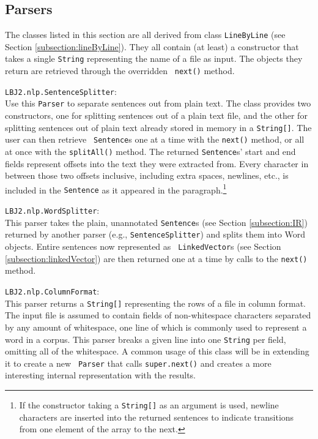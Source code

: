 \subsection{Parsers} \label{subsection:parsers}

The classes listed in this section are all derived from class {\tt LineByLine}
(see Section \ref{subsection:lineByLine}).  They all contain (at least) a
constructor that takes a single {\tt String} representing the name of a file
as input.  The objects they return are retrieved through the overridden {\tt
next()} method.

\begin{list}{}{}
\item[{\tt LBJ2.nlp.SentenceSplitter}:] ~\\
Use this {\tt Parser} to separate sentences out from plain text.  The class
provides two constructors, one for splitting sentences out of a plain text
file, and the other for splitting sentences out of plain text already stored
in memory in a {\tt String[]}.  The user can then retrieve {\tt
Sentence}s one at a time with the {\tt next()} method, or all at once with
the {\tt splitAll()} method.  The returned {\tt Sentence}s' start and end
fields represent offsets into the text they were extracted from.  Every
character in between those two offsets inclusive, including extra spaces,
newlines, etc., is included in the {\tt Sentence} as it appeared in the
paragraph.\footnote{If the constructor taking a {\tt String[]} as an
argument is used, newline characters are inserted into the returned sentences
to indicate transitions from one element of the array to the next.}

\item[{\tt LBJ2.nlp.WordSplitter}:] ~\\
This parser takes the plain, unannotated {\tt Sentence}s (see Section
\ref{subsection:IR}) returned by another parser (e.g., {\tt SentenceSplitter})
and splits them into Word objects.  Entire sentences now represented as {\tt
LinkedVector}s (see Section \ref{subsection:linkedVector}) are then returned
one at a time by calls to the {\tt next()} method.

\item[{\tt LBJ2.nlp.ColumnFormat}:] ~\\
This parser returns a {\tt String[]} representing the rows of a file in column
format.  The input file is assumed to contain fields of non-whitespace
characters separated by any amount of whitespace, one line of which is
commonly used to represent a word in a corpus.  This parser breaks a given
line into one {\tt String} per field, omitting all of the whitespace.  A
common usage of this class will be in extending it to create a new {\tt
Parser} that calls {\tt super.next()} and creates a more interesting internal
representation with the results.


\end{list}
